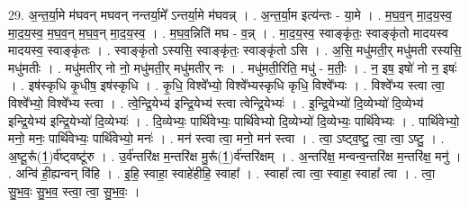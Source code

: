 \documentclass[17pt]{extarticle}
\begin{document}
29. अ॒न्त॒र्या॒मे म॑घवन् मघवन् नन्तर्या॒मे᳚ ऽन्तर्या॒मे म॑घवन्न् । . अ॒न्त॒र्या॒म इत्य॑न्तः - या॒मे । . म॒घ॒व॒न् मा॒द॒य॒स्व॒ मा॒द॒य॒स्व॒ म॒घ॒व॒न् म॒घ॒व॒न् मा॒द॒य॒स्व॒ । . म॒घ॒व॒न्निति॑ मघ - व॒न्न् । . मा॒द॒य॒स्व॒ स्वाङ्कृ॑तः॒ स्वाङ्कृ॑तो मादयस्व मादयस्व॒ स्वाङ्कृ॑तः । . स्वाङ्कृ॑तो ऽस्यसि॒ स्वाङ्कृ॑तः॒ स्वाङ्कृ॑तो ऽसि । . अ॒सि॒ मधु॑मती॒र् मधु॑मती रस्यसि॒ मधु॑मतीः । . मधु॑मतीर् नो नो॒ मधु॑मती॒र् मधु॑मतीर् नः । . मधु॑मती॒रिति॒ मधु॑ - म॒तीः॒ । . न॒ इष॒ इषो॑ नो न॒ इषः॑ । . इष॑स्कृधि कृ॒धीष॒ इष॑स्कृधि । . कृ॒धि॒ विश्वे᳚भ्यो॒ विश्वे᳚भ्यस्कृधि कृधि॒ विश्वे᳚भ्यः । . विश्वे᳚भ्य स्त्वा त्वा॒ विश्वे᳚भ्यो॒ विश्वे᳚भ्य स्त्वा । . त्वे॒न्द्रि॒येभ्य॑ इन्द्रि॒येभ्य॑ स्त्वा त्वेन्द्रि॒येभ्यः॑ । . इ॒न्द्रि॒येभ्यो॑ दि॒व्येभ्यो॑ दि॒व्येभ्य॑ इन्द्रि॒येभ्य॑ इन्द्रि॒येभ्यो॑ दि॒व्येभ्यः॑ । . दि॒व्येभ्यः॒ पार्थि॑वेभ्यः॒ पार्थि॑वेभ्यो दि॒व्येभ्यो॑ दि॒व्येभ्यः॒ पार्थि॑वेभ्यः । . पार्थि॑वेभ्यो॒ मनो॒ मनः॒ पार्थि॑वेभ्यः॒ पार्थि॑वेभ्यो॒ मनः॑ । . मन॑ स्त्वा त्वा॒ मनो॒ मन॑ स्त्वा । . त्वा॒ ऽष्ट्व॒ष्टु॒ त्वा॒ त्वा॒ ऽष्टु॒ । . अ॒ष्टू॒रू᳚(1॒)र्व॑ष्ट्वष्टू॑रु । . उ॒र्व॑न्तरि॑क्ष म॒न्तरि॑क्ष मु॒रू᳚(1॒)र्व॑न्तरि॑क्षम् । . अ॒न्तरि॑क्ष॒ मन्वन्व॒न्तरि॑क्ष म॒न्तरि॑क्ष॒ मनु॑ । . अन्वि॑ ही॒ह्यन्वन् वि॑हि । . इ॒हि॒ स्वाहा॒ स्वाहे॑हीहि॒ स्वाहा᳚ । . स्वाहा᳚ त्वा त्वा॒ स्वाहा॒ स्वाहा᳚ त्वा । . त्वा॒ सु॒भ॒वः॒ सु॒भ॒व॒ स्त्वा॒ त्वा॒ सु॒भ॒वः॒ । \newline
\end{document}
